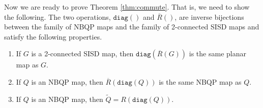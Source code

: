 \documentclass[10pt,a4paper]{article}
\newcommand{\diag}[0]{\mathtt{diag}}
\begin{document}
Now we are ready to prove Theorem \ref{thm:commute}. That is, we need to show the following. The two operations, $\diag()$ and $\overline R()$, are inverse bijections between the family of NBQP maps and the family of 2-connected SISD maps and satisfy the following properties.  

\begin{enumerate}
    \item[a)] If $G$ is a 2-connected SISD map, then $\diag(\overline R(G))$ is the same planar map as $G$.
    \item[b)] If $Q$ is an NBQP map, then $\overline R(\diag(Q))$ is the same NBQP map as $Q$.
    \item[c)] If $Q$ is an NBQP map, then $\widetilde Q=R(\diag(Q))$. 
\end{enumerate}
\end{document}
